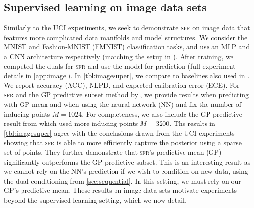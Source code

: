 \documentclass{article}
\newcommand{\our}{\textsc{sfr}\xspace}
\begin{document}
\subsection{Supervised learning on image data sets}
\label{sec:image}
Similarly to the UCI experiments, we seek to demonstrate \our on image data that features more complicated data manifolds and model structures.
We consider the MNIST and Fashion-MNIST (FMNIST) classification tasks, and use an MLP and a CNN architecture respectively (matching the setup in \cite{immer2021improving}).
After training, we computed the duals for \our and use the model for prediction (full experiment details in \cref{app:image}).
In \cref{tbl:imagesuper}, we compare to baselines also used in \cite{immer2021improving}.
We report accuracy (ACC), NLPD, and expected calibration error (ECE).
For \our and the GP predictive subset method by \cite{immer2021improving}, we provide results when predicting with GP mean and when using the neural network (NN) and
fix the number of inducing points $M=1024$.
For completeness, we also include the GP predictive result from \cite{immer2021improving} which used more inducing points $M=3200$.
The results in \cref{tbl:imagesuper} agree with the conclusions drawn from the UCI experiments showing that \our is able to more efficiently capture the posterior using a sparse set of points.
They further demonstrate that \our's predictive mean (GP) significantly outperforms the GP predictive subset.
This is an interesting result as we cannot rely on the NN's prediction if we wish to condition on new data, using the dual conditioning from \cref{sec:sequential}.
In this setting, we must rely on our GP's predictive mean.
These results on image data sets motivate experiments beyond the supervised learning setting, which we now detail.





\end{document}
